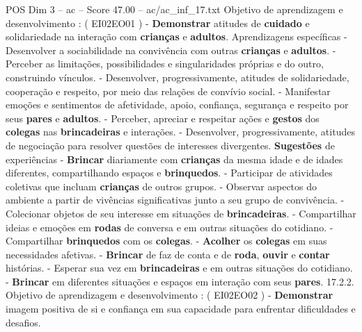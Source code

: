 \begin{textsample}{POS Dim 3 – ac – Score 47.00 – ac/ac\_inf\_17.txt}
Objetivo de aprendizagem e desenvolvimento : ( EI02EO01 ) - \textbf{Demonstrar} atitudes de \textbf{cuidado} e solidariedade na interação com \textbf{crianças} e \textbf{adultos}.
Aprendizagens específicas - Desenvolver a sociabilidade na convivência com outras \textbf{crianças} e \textbf{adultos}. - Perceber as limitações, possibilidades e singularidades próprias e do outro, construindo vínculos. - Desenvolver, progressivamente, atitudes de solidariedade, cooperação e respeito, por meio das relações de convívio social. - Manifestar emoções e sentimentos de afetividade, apoio, confiança, segurança e respeito por seus \textbf{pares} e \textbf{adultos}. - Perceber, apreciar e respeitar ações e \textbf{gestos} dos \textbf{colegas} nas \textbf{brincadeiras} e interações. - Desenvolver, progressivamente, atitudes de negociação para resolver questões de interesses divergentes. \textbf{Sugestões} de experiências - \textbf{Brincar} diariamente com \textbf{crianças} da mesma idade e de idades diferentes, compartilhando espaços e \textbf{brinquedos}. - Participar de atividades coletivas que incluam \textbf{crianças} de outros grupos. - Observar aspectos do ambiente a partir de vivências significativas junto a seu grupo de convivência. - Colecionar objetos de seu interesse em situações de \textbf{brincadeiras}. - Compartilhar ideias e emoções em \textbf{rodas} de conversa e em outras situações do cotidiano. - Compartilhar \textbf{brinquedos} com os \textbf{colegas}. - \textbf{Acolher} os \textbf{colegas} em suas necessidades afetivas. - \textbf{Brincar} de faz de conta e de \textbf{roda}, \textbf{ouvir} e \textbf{contar} histórias. - Esperar sua vez em \textbf{brincadeiras} e em outras situações do cotidiano. - \textbf{Brincar} em diferentes situações e espaços em interação com seus \textbf{pares}. 17.2.2.
Objetivo de aprendizagem e desenvolvimento : ( EI02EO02 ) - \textbf{Demonstrar} imagem positiva de si e confiança em sua capacidade para enfrentar dificuldades e desafios.

\end{textsample}
